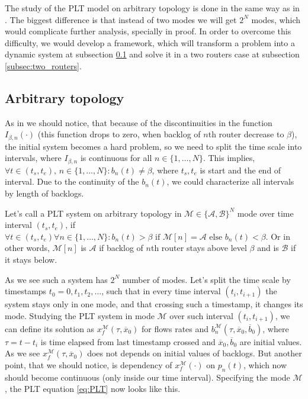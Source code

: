 The study of the PLT model on arbitrary topology is done in the same way as in \cite{Lai:PLT}. The biggest difference is that instead of two modes we will get $2^N$ modes, which would complicate further analysis, specially in \cite[Proposition 7.1]{Lai:PLT} proof. In order to overcome this difficulty, we would develop a framework, which will transform a problem into a dynamic system at subsection \ref{subsec:arbitary_topology} and solve it in a two routers case at subsection \ref{subsec:two_routers}.
\subsection{Arbitrary topology}
\label{subsec:arbitary_topology}
As in \cite{Lai:PLT} we should notice, that because of the discontinuities in the function $I_{\beta,n}(\cdot)$ (this function drops to zero, when backlog of $n$th router decrease to $\beta$), the initial system becomes a hard problem, so we need to split the time scale into intervals, where $I_{\beta,n}$ is continuous for all $n \in \{1,\ldots,N\}$. This implies, $\forall t \in (t_s, t_e),\, n \in \{1,\ldots,N\} : b_n(t) \neq \beta$, where $t_s,t_e$ is start and the end of interval. Due to the continuity of the $b_n(t)$, we could characterize all intervals by length of backlogs.
\begin{definition}
    Let's call a PLT system on arbitrary topology in $\mathcal{M} \in \{ \mathcal{A,B} \}^N$ mode over time interval $(t_s, t_e)$, if $\forall t \in (t_s, t_e) \forall n \in \{1,\ldots,N\} : b_n(t) > \beta \text{ if } \mathcal{M}[n] = \mathcal{A} \text{ else } b_n(t) < \beta$. Or in other words, $\mathcal{M}[n]$ is $\mathcal{A}$ if backlog of $n$th router stays above level $\beta$ and is $\mathcal{B}$ if it stays below.
\end{definition}
As we see such a system has $2^N$ number of modes. Let's split the time scale by timestamps $t_0 = 0, t_1, t_2, \ldots$, such that in every time interval $(t_i, t_{i+1})$ the system stays only in one mode, and that crossing such a timestamp, it changes its mode. Studying the PLT system in mode $\mathcal{M}$ over such interval $(t_i, t_{i+1})$, we can define its solution as $x^\mathcal{M}_f(\tau, \overline{x}_0)$ for flows rates and $b^\mathcal{M}_n(\tau, \overline{x}_0, \overline{b}_0)$, where $\tau = t - t_i$ is time elapsed from last timestamp crossed and $\overline{x}_0, \overline{b}_0$ are initial values. As we see $x^\mathcal{M}_f(\tau, \overline{x}_0)$ does not depends on initial values of backlogs. But another point, that we should notice, is dependency of $x^\mathcal{M}_f(\cdot)$ on $p_n(t)$, which now should become continuous (only inside our time interval). Specifying the mode $\mathcal{M}$, the PLT equation \ref{eq:PLT} now looks like this.
